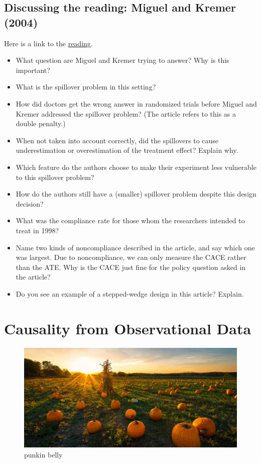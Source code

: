 \documentclass[
]{book}
\providecommand{\tightlist}{%
  \setlength{\itemsep}{0pt}\setlength{\parskip}{0pt}}
\begin{document}
\hypertarget{discussing-the-reading-miguel-and-kremer-2004}{%
\section{Discussing the reading: Miguel and Kremer
(2004)}\label{discussing-the-reading-miguel-and-kremer-2004}}

Here is a link to the
\href{https://github.com/UC-Berkeley-I-School/mids-w241/blob/main/readings/Miguel.2004.pdf}{reading}.

\begin{itemize}
\tightlist
\item
  What question are Miguel and Kremer trying to answer? Why is this
  important?\\
\item
  What is the spillover problem in this setting?
\item
  How did doctors get the wrong answer in randomized trials before
  Miguel and Kremer addressed the spillover problem? (The article refers
  to this as a double penalty.)
\item
  When not taken into account correctly, did the spillovers to cause
  underestimation or overestimation of the treatment effect? Explain
  why.
\item
  Which feature do the authors choose to make their experiment less
  vulnerable to this spillover problem?
\item
  How do the authors still have a (smaller) spillover problem despite
  this design decision?
\item
  What was the compliance rate for those whom the researchers intended
  to treat in 1998?
\item
  Name two kinds of noncompliance described in the article, and say
  which one was largest. Due to noncompliance, we can only measure the
  CACE rather than the ATE. Why is the CACE just fine for the policy
  question asked in the article?
\item
  Do you see an example of a stepped-wedge design in this article?
  Explain.
\end{itemize}

\hypertarget{causality-from-observational-data}{%
\chapter{Causality from Observational
Data}\label{causality-from-observational-data}}

\begin{figure}
\centering
\includegraphics{./images/punkin.jpeg}
\caption{punkin belly}
\end{figure}
\end{document}
